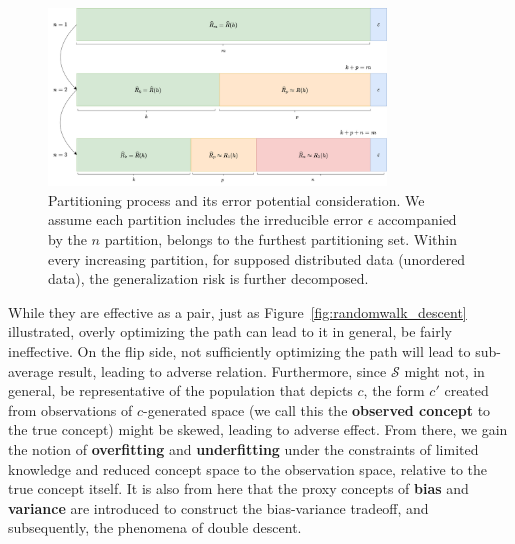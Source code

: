 \documentclass[10pt,oneside,oldfontcommands,dvipsnames,article]{memoir}
\begin{document}
\begin{figure}[htb]
    \centering
    \includegraphics[width=0.8\textwidth]{img/mamamia.png}
    \caption{Partitioning process and its error potential consideration. We assume each partition includes the irreducible error $\epsilon$ accompanied by the $n$ partition, belongs to the furthest partitioning set. Within every increasing partition, for supposed distributed data (unordered data), the generalization risk is further decomposed.}
\end{figure}

While they are effective as a pair, just as Figure~\ref{fig:randomwalk_descent} illustrated, overly optimizing the path can lead to it in general, be fairly ineffective. On the flip side, not sufficiently optimizing the path will lead to sub-average result, leading to adverse relation. Furthermore, since $\mathcal{S}$ might not, in general, be representative of the population that depicts $c$, the form $c'$ created from observations of $c$-generated space (we call this the \textbf{observed concept} to the true concept) might be skewed, leading to adverse effect. From there, we gain the notion of \textbf{overfitting} and \textbf{underfitting} under the constraints of limited knowledge and reduced concept space to the observation space, relative to the true concept itself. It is also from here that the proxy concepts of \textbf{bias} and \textbf{variance} are introduced to construct the bias-variance tradeoff, and subsequently, the phenomena of double descent. 
\end{document}
